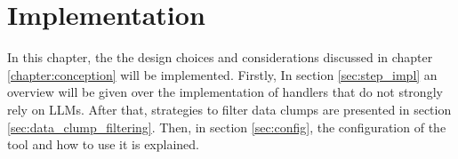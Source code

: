 \chapter{Implementation}\label{chapter:implementation}

In this chapter, the the design choices and considerations discussed in chapter \ref{chapter:conception} will be implemented. Firstly, In section \ref{sec:step_impl} an overview will be given over the implementation of handlers that do not  strongly rely on \acp{LLM}. After that, strategies to filter data clumps are presented in section \ref{sec:data_clump_filtering}.   Then, in section \ref{sec:config}, the configuration of the tool and how to use it is explained. 






